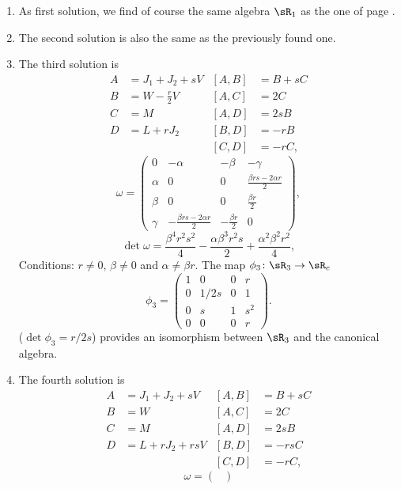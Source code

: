 \let\ANCtheenumi\theenumi
 \renewcommand{\theenumi}{\arabic{enumi}.} 
\begin{enumerate} 
\item As first solution, we find of course the same algebra $\sR_1$ as the one of page \pageref{PgAlgUn}.
\item The second solution is also the same as the previously found one.
\item The third solution is
\begin{align*}
A&=J_{1}+J_{2}+sV		&[A,B]&=B+sC\\
B&=W-\frac{ r }{2}V		&[A,C]&=2C\\
C&=M				&[A,D]&=2sB\\
D&=L+rJ_{2}			&[B,D]&=-rB\\
 &				&[C,D]&=-rC,
\end{align*}
\begin{equation}
\omega=\begin{pmatrix}
0	&-\alpha		&-\beta	&-\gamma\\
\alpha	&0			&0	&\frac{ \beta rs-2\alpha r  }{ 2 }\\
\beta	&0			&0	&\frac{ \beta r }{2}\\
\gamma	&-\frac{ \beta rs-2\alpha r  }{ 2 }	&-\frac{ \beta r }{2}	&0
\end{pmatrix},
\end{equation}
\[
  \det\omega=\frac{ \beta^{4}r^{2}s^{2} }{ 4 }-\frac{ \alpha\beta^{3}r^{2}s }{ 2 }+\frac{ \alpha^{2}\beta^{2}r^{2} }{ 4 },
\]
Conditions: $r\neq 0$, $\beta\neq 0$ and $\alpha\neq\beta r$. The map $\phi_3\colon \sR_3\to \sR_c$
\[ 
  \phi_3=
\begin{pmatrix}
1	&	0	&	0	&	r\\
0	&	1/2s	&	0	&	1\\
0	&	s	&	1	&	s^2\\
0	&	0	&	0	&	r
\end{pmatrix}.
\]
($\det\phi_3=r/2s$) provides an isomorphism between $\sR_3$ and the canonical algebra.
\item The fourth solution is
\begin{align*}
A&=J_{1}+J_{2}+sV		&[A,B]&=B+sC\\
B&=W				&[A,C]&=2C\\
C&=M				&[A,D]&=2sB\\
D&=L+rJ_{2}+rsV			&[B,D]&=-rsC\\
 &				&[C,D]&=-rC,
 \end{align*}
\begin{equation}
\omega=\begin{pmatrix}

\end{pmatrix}
\end{equation}
\end{enumerate}
